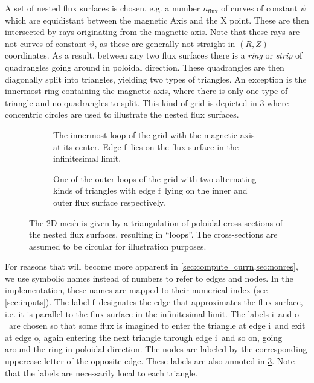 \documentclass[a4paper, twoside, 10pt, english]{article}
\numberwithin{equation}{section}
\let\temp\varrho
\let\varrho\rho
\let\rho\temp
\let\temp\vartheta
\let\vartheta\theta
\let\theta\temp
\let\temp\varphi
\let\varphi\phi
\let\phi\temp
\newcommand*\fs{\ensuremath{\textrm{f}}}  %
\newcommand*\inw{\ensuremath{\textrm{i}}}  %
\newcommand*\out{\ensuremath{\textrm{o}}}  %
\begin{document}
A set of nested flux surfaces is chosen, e.g. a number $n_{\text{flux}}$ of curves of constant $\psi$ which are equidistant between the magnetic Axis and the X point. These are then intersected by rays originating from the magnetic axis. Note that these rays are not curves of constant $\theta$, as these are generally not straight in $(R, Z)$ coordinates. As a result, between any two flux surfaces there is a \emph{ring} or \emph{strip} of quadrangles going around in poloidal direction. These quadrangles are then diagonally split into triangles, yielding two types of triangles. An exception is the innermost ring containing the magnetic axis, where there is only one type of triangle and no quadrangles to split. This kind of grid is depicted in \cref{fig:grid} where concentric circles are used to illustrate the nested flux surfaces.
\begin{figure}[bth]
  \centering
  \begin{subfigure}[b]{0.33\textwidth}
    \centering
    
    \caption{The innermost loop of the grid with the magnetic axis at its center. Edge \fs\ lies on the flux surface in the infinitesimal limit.}
    \label{fig:grid0}
  \end{subfigure}
  \quad
  \begin{subfigure}[b]{0.5\textwidth}
    \centering
    
    \caption{One of the outer loops of the grid with two alternating kinds of triangles with edge \fs\ lying on the inner and outer flux surface respectively.}
    \label{fig:grid1}
  \end{subfigure}
  \caption{The 2D mesh is given by a triangulation of poloidal cross-sections of the nested flux surfaces, resulting in \enquote{loops}. The cross-sections are assumed to be circular for illustration purposes.}
  \label{fig:grid}
\end{figure}

For reasons that will become more apparent in \cref{sec:compute_currn,sec:nonres}, we use symbolic names instead of numbers to refer to edges and nodes. In the implementation, these names are mapped to their numerical index (see \cref{sec:inputs}). The label \fs\ designates the edge that approximates the flux surface, i.e. it is parallel to the flux surface in the infinitesimal limit. The labels \inw\ and \out\ are chosen so that some flux is imagined to enter the triangle at edge \inw\ and exit at edge \out, again entering the next triangle through edge \inw\ and so on, going around the ring in poloidal direction. The nodes are labeled by the corresponding uppercase letter of the opposite edge. These labels are also annoted in \cref{fig:grid}. Note that the labels are necessarily local to each triangle.
\end{document}
